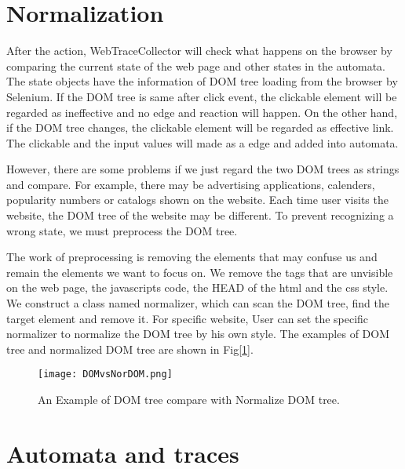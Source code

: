 \section{Normalization}

After the action, WebTraceCollector will check what happens on the browser 
by comparing the current state of the web page and other states in the automata.
The state objects have the information of DOM tree loading from the browser by Selenium.
If the DOM tree is same after click event, the clickable element will be regarded as ineffective and no edge and reaction will happen.
On the other hand, if the DOM tree changes, the clickable element will be regarded as effective link.
The clickable and the input values will made as a edge and added into automata.

However, there are some problems if we just regard the two DOM trees as strings and compare.
For example, there may be advertising applications, calenders, popularity numbers or catalogs shown on the website.
Each time user visits the website, the DOM tree of the website may be different.
To prevent recognizing a wrong state, we must preprocess the DOM tree.

The work of preprocessing is removing the elements that may confuse us and remain the elements we want to focus on.
We remove the tags that are unvisible on the web page, the javascripts code, the HEAD of the html and the css style.
We construct a class named normalizer, which can scan the DOM tree, find the target element and remove it.
For specific website, User can set the specific normalizer to normalize the DOM tree by his own style.
The examples of DOM tree and normalized DOM tree are shown in Fig[\ref{DOMvsNorDOM}].


\begin{figure}[h]
	\graphicspath{{pic/}}
	\begin{center}
		\texttt{[image: DOMvsNorDOM.png]}
	\end{center}
	\caption{An Example of DOM tree compare with Normalize DOM tree. }
	\label{DOMvsNorDOM}
\end{figure}

\clearpage

\section{Automata and traces}

